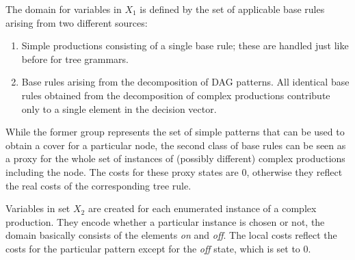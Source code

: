 The domain for variables in $X_1$ is defined by the set of applicable
base rules arising from two different sources:
\begin{enumerate}
\item Simple productions consisting of a single base rule; these are
  handled just like before for tree grammars.
\item Base rules arising from the decomposition of DAG patterns. All
  identical base rules obtained from the decomposition of complex
  productions contribute only to a single element in the decision
  vector.
\end{enumerate}
While the former group represents the set of simple patterns that can
be used to obtain a cover for a particular node, the second class of
base rules can be seen as a proxy for the whole set of instances of
(possibly different) complex productions including the node. The
costs for these proxy states are $0$, otherwise they reflect the
real costs of the corresponding tree rule.

Variables in set $X_2$ are created for each enumerated instance of a
complex production. They encode whether a particular instance is
chosen or not, \ie the domain basically consists of the elements
\textit{on} and \textit{off}. The local costs reflect the costs for
the particular pattern except for the \textit{off} state, which is set
to $0$.

